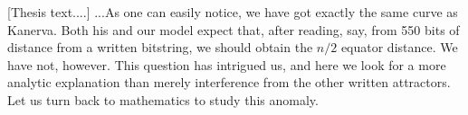 \documentclass[12pt]{article}
\begin{document}
[Thesis text....] ...As one can easily notice, we have got exactly the same curve as Kanerva. Both his and our model expect that, after reading, say, from 550 bits of distance from a written bitstring, we should obtain the $n/2$ equator distance. We have not, however.  This question has intrigued us, and here we look for a more analytic explanation than merely interference from the other written attractors. Let us turn back to mathematics to study this anomaly.


\end{document}
